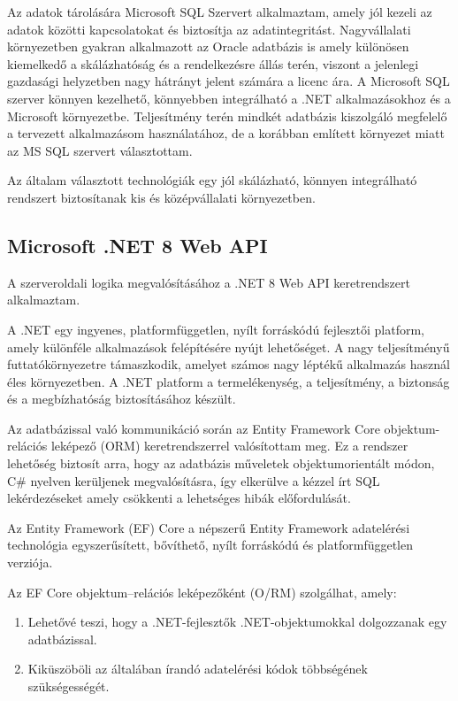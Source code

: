\documentclass[
]{thesis-ekf}
\theoremstyle{definition}
\theoremstyle{remark}
\begin{document}
Az adatok tárolására Microsoft SQL Szervert alkalmaztam, amely jól kezeli az adatok közötti kapcsolatokat és biztosítja az adatintegritást. Nagyvállalati környezetben gyakran alkalmazott az Oracle adatbázis is amely különösen kiemelkedő a skálázhatóság és a rendelkezésre állás terén, viszont a jelenlegi gazdasági helyzetben nagy hátrányt jelent számára a licenc ára. A Microsoft SQL szerver könnyen kezelhető, könnyebben integrálható a .NET alkalmazásokhoz és a Microsoft környezetbe. Teljesítmény terén mindkét adatbázis kiszolgáló megfelelő a tervezett alkalmazásom használatához, de a korábban említett környezet miatt az MS SQL szervert választottam.

Az általam választott technológiák egy jól skálázható, könnyen integrálható rendszert biztosítanak kis és középvállalati környezetben.

\subsection{Microsoft .NET 8 Web API}

A szerveroldali logika megvalósításához a .NET 8 Web API keretrendszert alkalmaztam.

A .NET egy ingyenes, platformfüggetlen, nyílt forráskódú fejlesztői platform, amely különféle alkalmazások felépítésére nyújt lehetőséget. 
A nagy teljesítményű futtatókörnyezetre támaszkodik, amelyet számos nagy léptékű alkalmazás használ éles környezetben.
A .NET platform a termelékenység, a teljesítmény, a biztonság és a megbízhatóság biztosításához készült. \cite{DotnetBevezetés}

Az adatbázissal való kommunikáció során az Entity Framework Core objektum-relációs leképező (ORM) keretrendszerrel valósítottam meg. Ez a rendszer lehetőség biztosít arra, hogy az adatbázis műveletek objektumorientált módon, C\# nyelven kerüljenek megvalósításra, így elkerülve a kézzel írt SQL lekérdezéseket amely csökkenti a lehetséges hibák előfordulását.

Az Entity Framework (EF) Core a népszerű Entity Framework adatelérési technológia egyszerűsített, bővíthető, nyílt forráskódú és platformfüggetlen verziója.

Az EF Core objektum--relációs leképezőként (O/RM) szolgálhat, amely:

\begin{enumerate}
	\item Lehetővé teszi, hogy a .NET-fejlesztők .NET-objektumokkal dolgozzanak egy adatbázissal.
	\item Kiküszöböli az általában írandó adatelérési kódok többségének szükségességét.
\end{enumerate}
\end{document}
